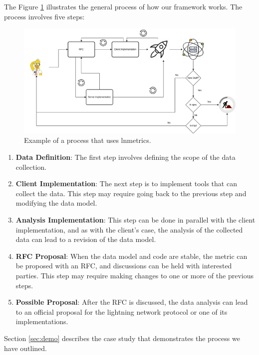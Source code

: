 The Figure \ref{fig:lnmetrics_process} illustrates the general process of how 
our framework works. The process involves five steps:

\begin{figure}
    \begin{center}
      \includegraphics[scale=0.7]{imgs/lnmetrics-workflow-drawio.png}
    \end{center}
    \caption{Example of a process that uses lnmetrics.}
    \label{fig:lnmetrics_process}
\end{figure}


\begin{enumerate}
\item {\bf Data Definition}: The first step involves defining the 
    scope of the data collection.
\item {\bf Client Implementation}: The next step is to implement tools that 
    can collect the data. This step may require going back to the previous step 
        and modifying the data model.
\item {\bf Analysis Implementation}: This step can be done in parallel with the 
    client implementation, and as with the client's case, the analysis of the 
        collected data can lead to a revision of the data model.
\item {\bf RFC Proposal}: When the data model and code are stable, the metric can be proposed 
    with an RFC, and discussions can be held with interested parties. This step may 
        require making changes to one or more of the previous steps.
\item {\bf Possible Proposal}: After the RFC is discussed, the data analysis can lead to an official 
    proposal for the lightning network protocol or one of its implementations.
\end{enumerate}

Section \ref{sec:demo} describes the case study that demonstrates the process we have outlined.

